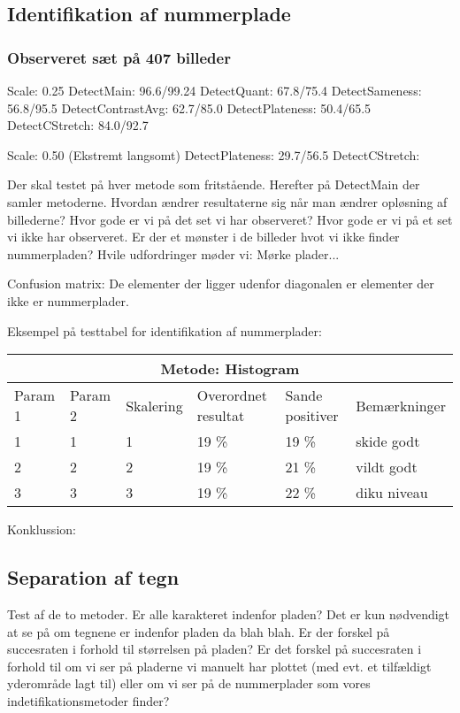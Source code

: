 \subsection{Identifikation af nummerplade}

\subsubsection*{Observeret sæt på 407 billeder}
Scale: 0.25
DetectMain: 96.6/99.24
DetectQuant: 67.8/75.4
DetectSameness: 56.8/95.5
DetectContrastAvg: 62.7/85.0
DetectPlateness: 50.4/65.5
DetectCStretch: 84.0/92.7

Scale: 0.50 (Ekstremt langsomt)
DetectPlateness: 29.7/56.5
DetectCStretch:

Der skal testet på hver metode som fritstående. Herefter på DetectMain der samler metoderne. Hvordan ændrer resultaterne sig når man ændrer opløsning af billederne?
Hvor gode er vi på det set vi har observeret? Hvor gode er vi på et set vi ikke har observeret. Er der et mønster i de billeder hvot vi ikke finder nummerpladen? Hvile udfordringer møder vi: Mørke plader... 

Confusion matrix: De elementer der ligger udenfor diagonalen er elementer der ikke er nummerplader.

Eksempel på testtabel for identifikation af nummerplader:

\begin{tabular}{|l|l|l|l|l|l|}
\hline
\multicolumn{6}{|c|}{Metode: Histogram} \\ \hline
Param 1 & Param 2 & Skalering & Overordnet resultat & Sande positiver & Bemærkninger\\ \hline
1 & 1 & 1 & 19 \% & 19 \% & skide godt\\ \hline
2 & 2 & 2 & 19 \% & 21 \% & vildt godt \\ \hline
3 & 3 & 3 & 19 \% & 22 \% & diku niveau \\
\hline
\end{tabular}

Konklussion:

\subsection{Separation af tegn}
Test af de to metoder.
Er alle karakteret indenfor pladen? Det er kun nødvendigt at se på om tegnene er indenfor pladen da blah blah. Er der forskel på succesraten i forhold til størrelsen på pladen? Er det forskel på succesraten i forhold til om vi ser på pladerne vi manuelt har plottet (med evt. et tilfældigt yderområde lagt til) eller om vi ser på de nummerplader som vores indetifikationsmetoder finder?

